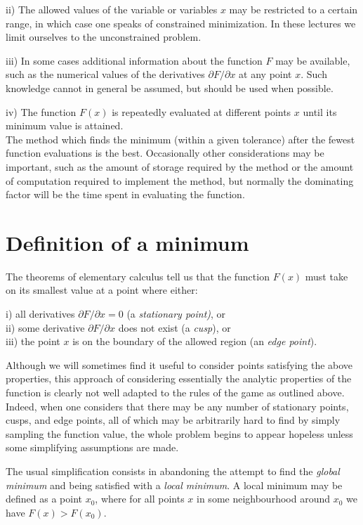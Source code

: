  ii) The allowed values of the variable or variables $x$ may be restricted
     to a certain range, 
     in which case one speaks of constrained
     minimization.  In these lectures we limit ourselves to the
     unconstrained problem.
 
iii) In some cases additional information about the function $F$ may be
     available, such as the numerical values of the
      derivatives $\partial F/\partial x$ at any point $x$.
     Such knowledge cannot in general be assumed, but
     should be used when possible.
 
 iv) The function $F(x)$ is repeatedly evaluated at different points $x$
     until its minimum value is attained.\\ \noindent
 The method which finds the minimum (within a given tolerance) after the
fewest function evaluations is the best.  Occasionally other considerations
may be important, such as the amount of storage required by the
method  or the amount of computation required to implement the method,
but normally the dominating factor will be the time spent in evaluating
the function.
 
 
\section{Definition of a minimum}
 
     The theorems of elementary calculus tell us that the function
$F(x)$ must take on its smallest value at a point where either:
 
  i) all derivatives $\partial F/\partial x = 0$ (a {\em stationary point)}, or\\ \indent
 ii) some derivative $\partial F/\partial x$ does not exist (a {\em cusp}), or\\ \indent
iii) the point $x$ is on the boundary of the allowed region (an {\em edge point}).
 
     Although we will sometimes find it useful to consider points
satisfying the above properties, this approach of considering essentially
the analytic properties of the function is clearly not well adapted to
the rules of the game as outlined above.  Indeed, when one considers that
there may be any number of stationary points, cusps, and edge points,
all of which may be arbitrarily hard to find by simply sampling the
function value, the whole problem begins to appear hopeless unless some
simplifying assumptions are made.
 
     The usual simplification consists in abandoning the attempt to find
the {\em global minimum} and being satisfied with a {\em local minimum}.  A local
minimum may be defined as a point $x_0$, where for all points $x$ in some
neighbourhood around $x_0$ we have $F(x) > F(x_0)$.
 

